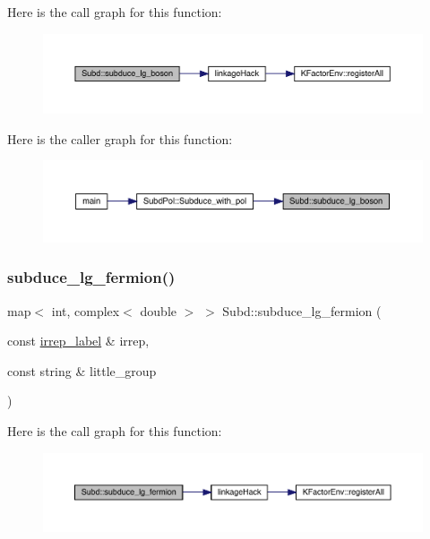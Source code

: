 Here is the call graph for this function\+:\nopagebreak
\begin{figure}[H]
\begin{center}
\leavevmode
\includegraphics[width=350pt]{d8/d2b/namespaceSubd_a5f31b3ef70ad25320a8010ec3017eb04_cgraph}
\end{center}
\end{figure}
Here is the caller graph for this function\+:\nopagebreak
\begin{figure}[H]
\begin{center}
\leavevmode
\includegraphics[width=350pt]{d8/d2b/namespaceSubd_a5f31b3ef70ad25320a8010ec3017eb04_icgraph}
\end{center}
\end{figure}
\mbox{\label{namespaceSubd_ae7ed68270fb8f7b5f574db245b085586}} 
\subsubsection{\texorpdfstring{subduce\_lg\_fermion()}{subduce\_lg\_fermion()}}
{\footnotesize\ttfamily map$<$ int, complex$<$ double $>$ $>$ Subd\+::subduce\+\_\+lg\+\_\+fermion (\begin{DoxyParamCaption}\item[{const \mbox{\hyperlink{structirrep__label}{irrep\+\_\+label}} \&}]{irrep,  }\item[{const string \&}]{little\+\_\+group }\end{DoxyParamCaption})}

Here is the call graph for this function\+:\nopagebreak
\begin{figure}[H]
\begin{center}
\leavevmode
\includegraphics[width=350pt]{d8/d2b/namespaceSubd_ae7ed68270fb8f7b5f574db245b085586_cgraph}
\end{center}
\end{figure}
\mbox{\label{namespaceSubd_aa8b77162377de658856d44a4ac5aad26}} 
